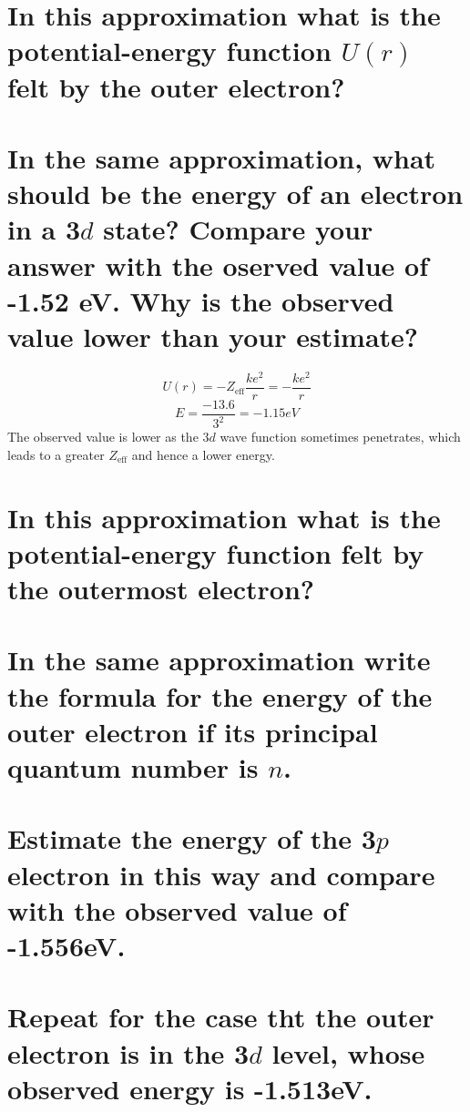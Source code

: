 \documentclass[answers]{exam}
\begin{document}
\begin{questions}
\begin{parts}
	\part{In this approximation what is the potential-energy function $U(r)$ felt by the outer electron?}
	\part{In the same approximation, what should be the energy of an electron in a 3$d$ state? Compare your answer with the oserved value of -1.52 eV. Why is the observed value lower than your estimate?}
\end{parts}

\begin{solution}
	$$U(r) = -Z_{\text{eff}}\frac{ke^2}{r} = -\frac{ke^2}{r}$$
	$$E = \frac{-13.6}{3^2} = -1.15\unit{eV}$$
	The observed value is lower as the 3$d$ wave function sometimes penetrates, which leads to a greater $Z_{\text{eff}}$ and hence a lower energy.
\end{solution}


\begin{parts}
	\part{In this approximation what is the potential-energy function felt by the outermost electron?}
	\part{In the same approximation write the formula for the energy of the outer electron if its principal quantum number is $n$.}
	\part{Estimate the energy of the 3$p$ electron in this way and  compare with the observed value of -1.556\unit{eV}.}
	\part{Repeat for the case tht the outer electron is in the 3$d$ level, whose observed energy is -1.513\unit{eV}.}

\end{parts}
\end{questions}
\end{document}
